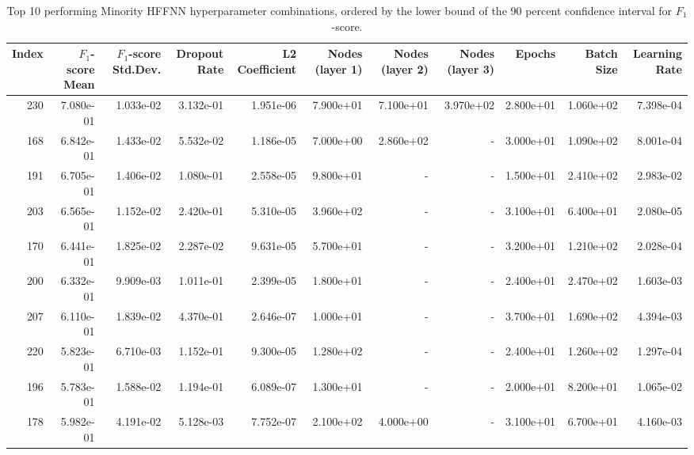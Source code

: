 \begin{table}
\caption{Top 10 performing Minority HFFNN hyperparameter combinations, ordered by the lower bound of the 90 percent confidence interval for $F_1$-score.}
\label{tab:05_best_minority_hffnn_hpars}
\begin{tabular}{rrrrrrrrrrr}
\toprule
Index & $F_1$-score Mean & $F_1$-score Std.Dev. & Dropout Rate & L2 Coefficient & Nodes (layer 1) & Nodes (layer 2) & Nodes (layer 3) & Epochs & Batch Size & Learning Rate \\
\midrule
230 & 7.080e-01 & 1.033e-02 & 3.132e-01 & 1.951e-06 & 7.900e+01 & 7.100e+01 & 3.970e+02 & 2.800e+01 & 1.060e+02 & 7.398e-04 \\
168 & 6.842e-01 & 1.433e-02 & 5.532e-02 & 1.186e-05 & 7.000e+00 & 2.860e+02 & - & 3.000e+01 & 1.090e+02 & 8.001e-04 \\
191 & 6.705e-01 & 1.406e-02 & 1.080e-01 & 2.558e-05 & 9.800e+01 & - & - & 1.500e+01 & 2.410e+02 & 2.983e-02 \\
203 & 6.565e-01 & 1.152e-02 & 2.420e-01 & 5.310e-05 & 3.960e+02 & - & - & 3.100e+01 & 6.400e+01 & 2.080e-05 \\
170 & 6.441e-01 & 1.825e-02 & 2.287e-02 & 9.631e-05 & 5.700e+01 & - & - & 3.200e+01 & 1.210e+02 & 2.028e-04 \\
200 & 6.332e-01 & 9.909e-03 & 1.011e-01 & 2.399e-05 & 1.800e+01 & - & - & 2.400e+01 & 2.470e+02 & 1.603e-03 \\
207 & 6.110e-01 & 1.839e-02 & 4.370e-01 & 2.646e-07 & 1.000e+01 & - & - & 3.700e+01 & 1.690e+02 & 4.394e-03 \\
220 & 5.823e-01 & 6.710e-03 & 1.152e-01 & 9.300e-05 & 1.280e+02 & - & - & 2.400e+01 & 1.260e+02 & 1.297e-04 \\
196 & 5.783e-01 & 1.588e-02 & 1.194e-01 & 6.089e-07 & 1.300e+01 & - & - & 2.000e+01 & 8.200e+01 & 1.065e-02 \\
178 & 5.982e-01 & 4.191e-02 & 5.128e-03 & 7.752e-07 & 2.100e+02 & 4.000e+00 & - & 3.100e+01 & 6.700e+01 & 4.160e-03 \\
\bottomrule
\end{tabular}
\end{table}
